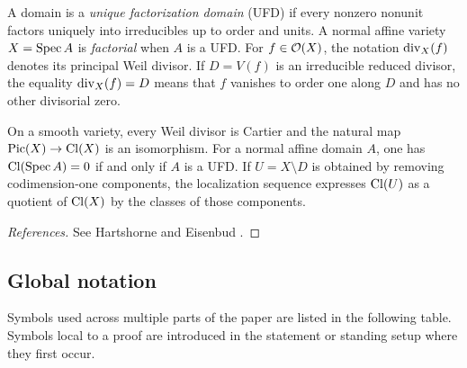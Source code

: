 \begin{definition}\label{def:factorial-principal}
A domain is a \emph{unique factorization domain} (UFD) if every nonzero nonunit factors uniquely into irreducibles up to order and units.  A normal affine variety $X=\operatorname{Spec} A$ is \emph{factorial} when $A$ is a UFD.  For $f\in\mathcal O(X)$, the notation $\operatorname{div}_X(f)$ denotes its principal Weil divisor.  If $D=V(f)$ is an irreducible reduced divisor, the equality $\operatorname{div}_X(f)=D$ means that $f$ vanishes to order one along $D$ and has no other divisorial zero.
\end{definition}

\begin{recalledproposition}\label{prop:pic-cl-ufd}
On a smooth variety, every Weil divisor is Cartier and the natural map $\operatorname{Pic}(X)\to\operatorname{Cl}(X)$ is an isomorphism.  For a normal affine domain $A$, one has $\operatorname{Cl}(\operatorname{Spec} A)=0$ if and only if $A$ is a UFD.  If $U=X\setminus D$ is obtained by removing codimension-one components, the localization sequence expresses $\operatorname{Cl}(U)$ as a quotient of $\operatorname{Cl}(X)$ by the classes of those components.
\end{recalledproposition}

\begin{proof}[References]
See Hartshorne \cite[Chapter II, Section 6, especially Propositions 6.2 and 6.5 and Corollary 6.16]{Hartshorne1977} and Eisenbud \cite[Chapters 4 and 11]{Eisenbud1995}.
\end{proof}

\subsection{Global notation}

\begin{notation}\label{not:global}
Symbols used across multiple parts of the paper are listed in the following table.  Symbols local to a proof are introduced in the statement or standing setup where they first occur.
\end{notation}

